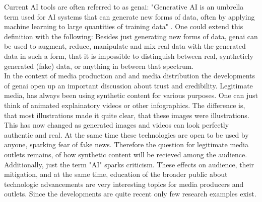 \documentclass[
  a4paper,  %
  twoside,  %
  bibliography=totoc,
  headsepline,
  cleardoublepage=empty,
  parskip=half,
  draft=false
]{scrbook}
\begin{document}
Current AI tools are often referred to as \gls{genai}: "Generative AI is an umbrella term used for AI systems that can generate new forms of data, often by applying machine learning to large quantities of training data" \citet{arguedasAutomatingDemocracyGenerative2023}. One could extend this definition with the following: Besides just generating new forms of data, \gls{genai} can be used to augment, reduce, manipulate and mix real data with the generated data in such a form, that it is impossible to distinguish between real, syntheticly generated (fake) data, or anything in between that spectrum. \\
In the context of media production and and media distribution the developments of \gls{genai} open up an important discussion about trust and credibility. Legitimate media, has always been using synthetic content for various purposes. One can just think of animated explainatory videos or other infographics. The difference is, that most illustrations made it quite clear, that these images were illustrations. This has now changed as generated images and videos can look perfectly authentic and real. At the same time these technologies are open to be used by anyone, sparking fear of fake news. Therefore the question for legitimate media outlets remains, of how synthetic content will be recieved among the audience. Additionally, just the term "AI" sparks criticism. These effects on audience, their mitigation, and at the same time, education of the broader public about technologic advancements are very interesting topics for media producers and outlets. Since the developments are quite recent only few research examples exist.
\end{document}
